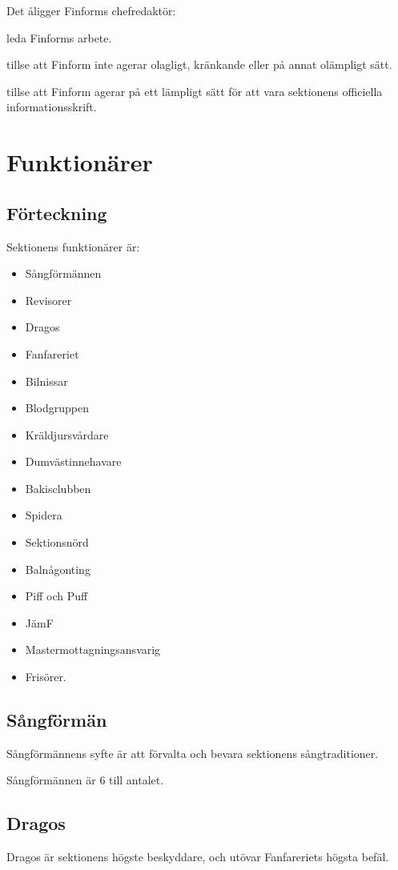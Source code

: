 \documentclass{styrdokument}
\begin{document}
\? Det åligger Finforms chefredaktör:
\begin{aligganden}
    \item leda Finforms arbete.
    \item tillse att Finform inte agerar olagligt, kränkande eller på annat olämpligt sätt.
    \item tillse att Finform agerar på ett lämpligt sätt för att vara sektionens officiella informationsskrift.
\end{aligganden}

\section{Funktionärer}
\subsection{Förteckning}
\? Sektionens funktionärer är:
\begin{itemize}
	\item Sångförmännen
	\item Revisorer
	\item Dragos
	\item Fanfareriet
	\item Bilnissar
	\item Blodgruppen
	\item Kräldjursvårdare
	\item Dumvästinnehavare
	\item Bakisclubben
	\item Spidera
	\item Sektionsnörd
	\item Balnågonting
	\item Piff och Puff
	\item JämF
	\item Mastermottagningsansvarig
	\item Frisörer.
\end{itemize}

\subsection{Sångförmän}
\? Sångförmännens syfte är att förvalta och bevara sektionens sångtraditioner.

\? Sångförmännen är 6 till antalet.

\subsection{Dragos}
\? Dragos är sektionens högste beskyddare, och utövar Fanfareriets högsta befäl.
\end{document}
